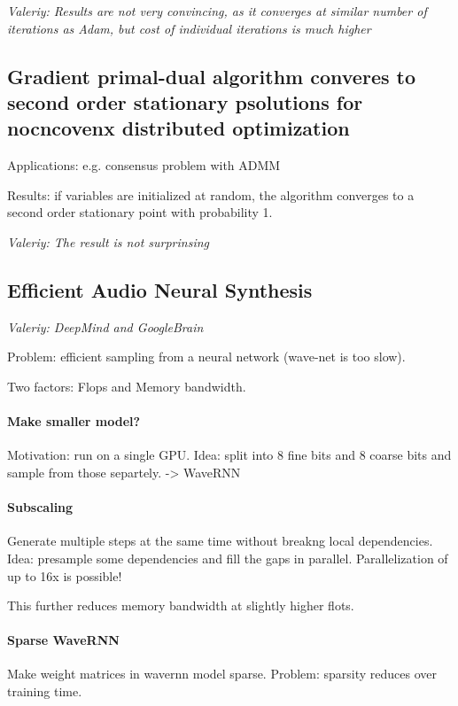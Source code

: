 \documentclass[11pt,oneside,a4paper]{scrartcl}
\newcommand{\valeriy}[1]{{\color{blue}\textit{Valeriy: #1}}}
\begin{document}
\valeriy{Results are not very convincing, as it converges at similar
  number of iterations as Adam, but cost of individual iterations is
  much higher}

\subsection{Gradient primal-dual algorithm converes to second order
  stationary psolutions for  nocncovenx distributed optimization \cite{hong18a}}
\label{sec:gradient-primal-dual}

Applications: e.g. consensus problem with ADMM

Results: if variables are initialized at random, the algorithm
converges to a second order stationary point with probability 1.

\valeriy{The result is not surprinsing}

\subsection{Efficient Audio Neural Synthesis \cite{kalchbrenner18a}}

\valeriy{DeepMind and GoogleBrain}

Problem: efficient sampling from a neural network (wave-net is too
slow).

Two factors: Flops and Memory bandwidth.

\paragraph{Make smaller model?}
Motivation: run on a single GPU. Idea: split into 8 fine bits and 8
coarse bits and sample from those separtely. -> WaveRNN

\paragraph{Subscaling}

Generate multiple steps at the same time without breakng local dependencies.
Idea: presample some dependencies and fill the gaps in
parallel. Parallelization of up to 16x is possible!

This further reduces memory bandwidth at slightly higher flots.

\paragraph{Sparse WaveRNN}

Make weight matrices in wavernn model sparse. Problem: sparsity
reduces over training time.
\end{document}
